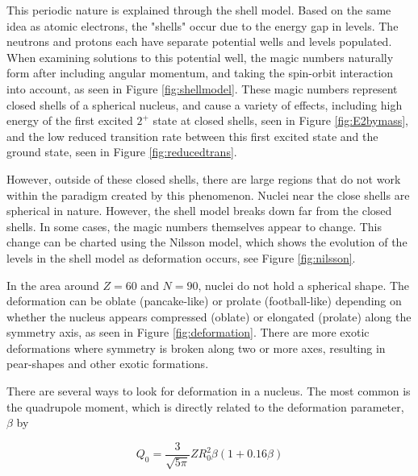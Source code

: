 This periodic nature is explained through the shell model. Based on the same idea as atomic electrons, the "shells" occur due to the energy gap in levels. The neutrons and protons each have separate potential wells and levels populated. When examining solutions to this potential well, the magic numbers naturally form after including angular momentum, and taking the spin-orbit interaction into account, as seen in Figure \ref{fig:shellmodel}. These magic numbers represent closed shells of a spherical nucleus, and cause a variety of effects, including high energy of the first excited $2^+$ state at closed shells, seen in Figure \ref{fig:E2bymass}, and the low reduced transition rate between this first excited state and the ground state, seen in Figure \ref{fig:reducedtrans}.







However, outside of these closed shells, there are large regions that do not work within the paradigm created by this phenomenon. Nuclei near the close shells are spherical in nature. However, the shell model breaks down far from the closed shells. In some cases, the magic numbers themselves appear to change. This change can be charted using the Nilsson model, which shows the evolution of the levels in the shell model as deformation occurs, see Figure \ref{fig:nilsson}.



In the area around $Z=60$ and $N=90$, nuclei do not hold a spherical shape. The deformation can be oblate (pancake-like) or prolate (football-like) depending on whether the nucleus appears compressed (oblate) or elongated (prolate) along the symmetry axis, as seen in Figure \ref{fig:deformation}. There are more exotic deformations where symmetry is broken along two or more axes, resulting in pear-shapes and other exotic formations.



There are several ways to look for deformation in a nucleus. The most common is the quadrupole moment, which is directly related to the deformation parameter, $\beta$ by

\begin{equation}
    Q_0 = \frac{3}{\sqrt{5\pi}}ZR_0^2\beta\left(1+0.16\beta\right)
\end{equation}

